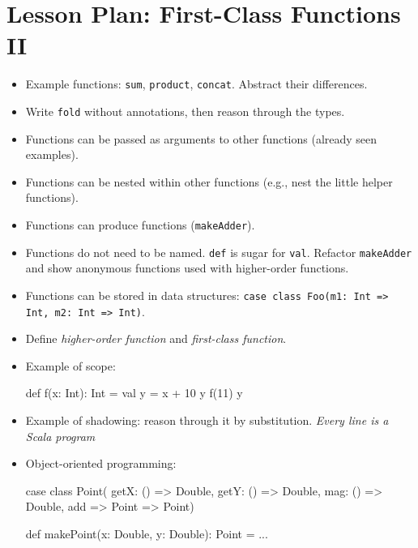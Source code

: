 \documentclass[9pt]{extbook}
\begin{document}
\chapter{Lesson Plan: First-Class Functions II}

\begin{itemize}

\item Example functions: \lstinline|sum|, \lstinline|product|, \lstinline|concat|. Abstract their differences.

\item Write \lstinline|fold| without annotations, then reason through the types.

\item Functions can be passed as arguments to other functions (already seen examples).

\item Functions can be nested within other functions (e.g., nest the little helper functions).

\item Functions can produce functions (\lstinline|makeAdder|).

\item Functions do not need to be named. \lstinline|def| is sugar for
  \lstinline|val|. Refactor \lstinline|makeAdder| and show anonymous
  functions used with higher-order functions.

\item Functions can be stored in data structures:
  \lstinline|case class Foo(m1: Int => Int, m2: Int => Int)|.

\item Define \emph{higher-order function} and \emph{first-class function}.

\item Example of scope:

  \begin{scalacode}
  def f(x: Int): Int = {
    val y = x + 10
    y
  }
  f(11)
  y
  \end{scalacode}

\item Example of shadowing: reason through it by
  substitution. \emph{Every line is a Scala program}

\item Object-oriented programming:

\begin{scalacode}
case class Point(
  getX: () => Double,
  getY: () => Double,
  mag: () => Double,
  add => Point => Point)

def makePoint(x: Double, y: Double): Point = ...
\end{scalacode}

\end{itemize}
\end{document}
